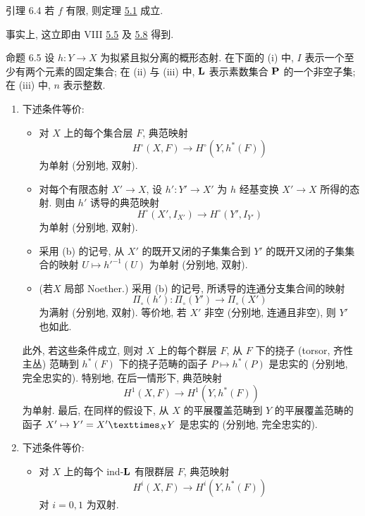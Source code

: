 \begin{enonce*}{引理 6.4}
若 $f$ 有限, 则定理 \hyperref[XII.thm5.1]{5.1} 成立.
\end{enonce*}

事实上, 这立即由 VIII \hyperref[VIII.prop5.5]{5.5} 及 \hyperref[VIII.rem5.8]{5.8} 得到.

\begin{enonce*}{命题 6.5}
设 $h:Y\to X$ 为拟紧且拟分离的概形态射. 在下面的 {\rm (i)} 中, $I$ 表示一个至少有两个元素的固定集合; 在 {\rm (ii)} 与 {\rm (iii)} 中, $\mathbf{L}$ 表示素数集合 $\mathbf{P}$ 的一个非空子集; 在 {\rm (iii)} 中, $n$ 表示整数.
\begin{enumerate}
\renewcommand{\theenumi}{\roman{enumi}}
\renewcommand{\labelenumi}{(\theenumi)}
\item 下述条件等价:
\begin{itemize}
\item[a)] 对 $X$ 上的每个集合层 $F$, 典范映射
$$
H^{\circ}(X,F)\longrightarrow H^{\circ}(Y,h^{\ast}(F))
$$
为单射 (分别地, 双射).

\item[b)] 对每个有限态射 $X'\to X$, 设 $h':Y'\to X'$ 为 $h$ 经基变换 $X'\to X$ 所得的态射. 则由 $h'$ 诱导的典范映射
$$
H^{\circ}(X', I_{X'})\longrightarrow H^{\circ}(Y',I_{Y'})
$$
为单射 (分别地, 双射).

\item[${\rm b')}$] 采用 {\rm (b)} 的记号, 从 $X'$ 的既开又闭的子集集合到 $Y'$ 的既开又闭的子集集合的映射 $U\mapsto {h'}^{-1}(U)$ 为单射 (分别地, 双射).

\item[${\rm b'')}$] (若\pageoriginale $X$ 局部 Noether.) 采用 {\rm (b)} 的记号, 所诱导的连通分支集合间的映射
$$
\Pi_{\circ}(h'):\Pi_{\circ}(Y')\longrightarrow \Pi_{\circ}(X')
$$
为满射 (分别地, 双射). 等价地, 若 $X'$ 非空 (分别地, 连通且非空), 则 $Y'$ 也如此.
\end{itemize}

此外, 若这些条件成立, 则对 $X$ 上的每个群层 $F$, 从 $F$ 下的挠子 (torsor, 齐性主丛) 范畴到 $h^{\ast}(F)$ 下的挠子范畴的函子 $P\mapsto h^{\ast}(P)$ 是忠实的 (分别地, 完全忠实的). 特别地, 在后一情形下, 典范映射
$$
H^1(X,F)\longrightarrow H^1(Y,h^{\ast}(F))
$$
为单射. 最后, 在同样的假设下, 从 $X$ 的平展覆盖范畴到 $Y$ 的平展覆盖范畴的函子 $X'\mapsto Y'=\fprod{X'}{Y}{X}$ 是忠实的 (分别地, 完全忠实的).

\item 下述条件等价:
\begin{itemize}
\item[a)] 对 $X$ 上的每个 ind-$\mathbf{L}$ 有限群层 $F$, 典范映射
$$
H^i(X,F)\longrightarrow H^i(Y,h^{\ast}(F))
$$
对 $i=0,1$ 为双射.


\end{itemize}
\end{enumerate}
\end{enonce*}
